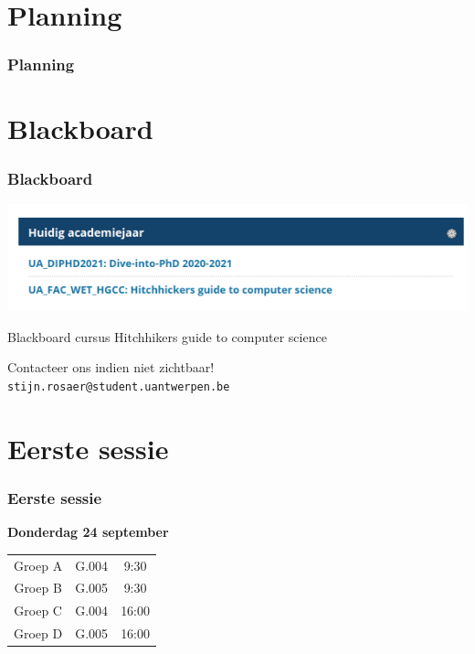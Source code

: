 
\section{Planning}
\addtocounter{minutes}{3}
\begin{frame}
	\frametitle{Planning}
    

\end{frame}

\section{Blackboard}
\begin{frame}
    \frametitle{Blackboard}
    \includegraphics[scale=0.5]{res/bb.png}    

	
	Blackboard cursus Hitchhikers guide to computer science
	\vspace{1cm}

	Contacteer ons indien niet zichtbaar!\\
	\texttt{stijn.rosaer@student.uantwerpen.be}
\end{frame}

\section{Eerste sessie}
\begin{frame}
	\frametitle{Eerste sessie}
	\textbf{Donderdag 24 september}\\
	\vspace{1cm}
	
	\begin{center}
	\begin{tabular}{c|c|c}
    Groep A & G.004 & 9:30\\
    Groep B & G.005 & 9:30\\ \hline
    Groep C & G.004 & 16:00\\
    Groep D & G.005 & 16:00
    \end{tabular}
	\end{center}
    
\end{frame}







